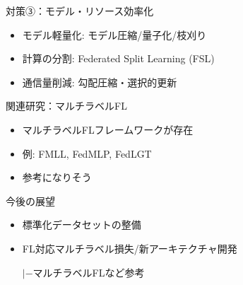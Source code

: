 \documentclass[unicode,12pt,aspectratio=169,dvipdfmx]{beamer}
\begin{document}
\begin{frame}{対策③：モデル・リソース効率化}
  \begin{itemize}
    \item モデル軽量化: モデル圧縮/量子化/枝刈り
    \item 計算の分割: Federated Split Learning (FSL)\cite{FSL}
    \item 通信量削減: 勾配圧縮・選択的更新
  \end{itemize}
\end{frame}
\begin{frame}{関連研究：マルチラベルFL}
  \begin{itemize}
    \item マルチラベルFLフレームワークが存在
    \item 例: FMLL\cite{FMLL}, FedMLP\cite{FedMLP}, FedLGT\cite{FedLGT}
    \item 参考になりそう
  \end{itemize}
\end{frame}
\begin{frame}{今後の展望}
  \begin{itemize}
    \item 標準化データセットの整備
    \item FL対応マルチラベル損失/新アーキテクチャ開発

    $|-$マルチラベルFLなど参考
  \end{itemize}
\end{frame}
\end{document}
